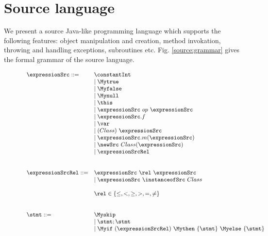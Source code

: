
\newtheorem{Expression}{Definition}[section]
\newtheorem{ExpressionRel}[Expression]{Definition}
\newtheorem{Statement}[Expression]{Definition}

\section{Source language} \label{source}


We present a source Java-like programming language which supports the following features:
object manipulation and creation, method invokation, throwing and handling exceptions, subroutines etc. Fig. \ref{source:grammar} gives the formal grammar of the source language.
\begin{figure}[ht!] 
\begin{frameit}
   $$ \begin{array} {ll}    
     \expressionSrc ::=         & \constantInt  \\
				& \mid \Mytrue \\ 
				& \mid \Myfalse \\
				& \mid \Mynull  \\
				& \mid \this \\
				& \mid \expressionSrc \ op \ \expressionSrc \\  
				& \mid \expressionSrc.f \\
				& \mid \var \\
  			        & \mid (Class) \ \expressionSrc \\
				& \mid \expressionSrc.m(\expressionSrc) \\
				& \mid  \newSrc \ Class  ( \expressionSrc  ) \\ 
				& \mid \expressionSrcRel \\
                                & \\
				& \\
     \expressionSrcRel ::=      & \expressionSrc \ \rel \ \expressionSrc \\
				& \mid \expressionSrc \ \instanceofSrc \ Class\\
				& \\   
				& \rel \in \{ \le, < ,  \ge, >, = , \neq \}      \\
				& \\
				& \\
      \stmt ::=		        & \Myskip \\
                                & \mid \stmt;\stmt \\
                                & \mid \Myif \ (\expressionSrcRel) \ \Mythen \ \{ \stmt \} \  \Myelse \ \{ \stmt \}  \\

\end{array}$$
\end{frameit}
\end{figure}
